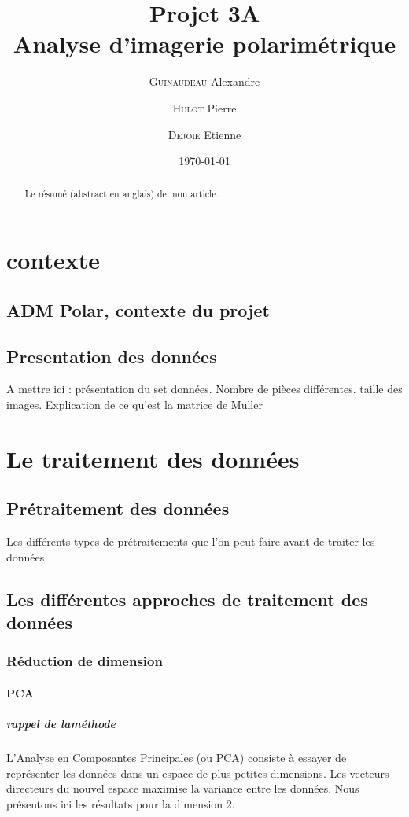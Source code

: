 \documentclass[a4paper,10pt]{report}
\title{Projet 3A\\Analyse d'imagerie polarimétrique}
\author{\textsc{Guinaudeau} Alexandre\\
	\and 
	\textsc{Hulot} Pierre
	\and 
	\textsc{Dejoie} Etienne	
	}
\date{\today}
\begin{document}
\maketitle

\begin{abstract}
Le résumé (abstract en anglais) de mon article.
\end{abstract}

\chapter{contexte}
\section{ADM Polar, contexte du projet}
\section{Presentation des données}
 A mettre ici : présentation du set données. Nombre de pièces différentes. taille des images. Explication de ce qu'est la matrice de Muller


\chapter{Le traitement des données}

\section{Prétraitement des données}
Les différents types de prétraitements que l'on peut faire avant de traiter les données

\section{Les différentes approches de traitement des données}

\subsection{Réduction de dimension}
\subsubsection{PCA}
\paragraph{rappel de laméthode }
L'Analyse en Composantes Principales (ou PCA) consiste à essayer de représenter les données dans un espace de plus petites dimensions. Les vecteurs directeurs du nouvel espace maximise la variance entre les données. Nous présentons ici les résultats pour la dimension 2.
\end{document}

